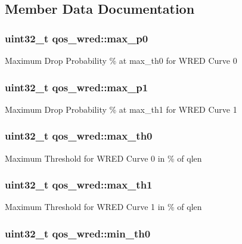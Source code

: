 \subsection{Member Data Documentation}
\hypertarget{structqos__wred_acc7d45f6204665b61a572a8ab338a5da}{
\subsubsection[{max\-\_\-p0}]{\setlength{\rightskip}{0pt plus 5cm}uint32\-\_\-t qos\-\_\-wred\-::max\-\_\-p0}}\label{structqos__wred_acc7d45f6204665b61a572a8ab338a5da}
Maximum Drop Probability \% at max\-\_\-th0 for W\-R\-E\-D Curve 0 \hypertarget{structqos__wred_a10a26159a7b75615c704cf85a53201b6}{
\subsubsection[{max\-\_\-p1}]{\setlength{\rightskip}{0pt plus 5cm}uint32\-\_\-t qos\-\_\-wred\-::max\-\_\-p1}}\label{structqos__wred_a10a26159a7b75615c704cf85a53201b6}
Maximum Drop Probability \% at max\-\_\-th1 for W\-R\-E\-D Curve 1 \hypertarget{structqos__wred_a348045f227c28243a2399d45db0d144c}{
\subsubsection[{max\-\_\-th0}]{\setlength{\rightskip}{0pt plus 5cm}uint32\-\_\-t qos\-\_\-wred\-::max\-\_\-th0}}\label{structqos__wred_a348045f227c28243a2399d45db0d144c}
Maximum Threshold for W\-R\-E\-D Curve 0 in \% of qlen \hypertarget{structqos__wred_ae7542f270e832e26f5bd6cc1abd5b75c}{
\subsubsection[{max\-\_\-th1}]{\setlength{\rightskip}{0pt plus 5cm}uint32\-\_\-t qos\-\_\-wred\-::max\-\_\-th1}}\label{structqos__wred_ae7542f270e832e26f5bd6cc1abd5b75c}
Maximum Threshold for W\-R\-E\-D Curve 1 in \% of qlen \hypertarget{structqos__wred_ac49810c9d53aa8638bcdd24a2ec13d7f}{
\subsubsection[{min\-\_\-th0}]{\setlength{\rightskip}{0pt plus 5cm}uint32\-\_\-t qos\-\_\-wred\-::min\-\_\-th0}}\label{structqos__wred_ac49810c9d53aa8638bcdd24a2ec13d7f}
